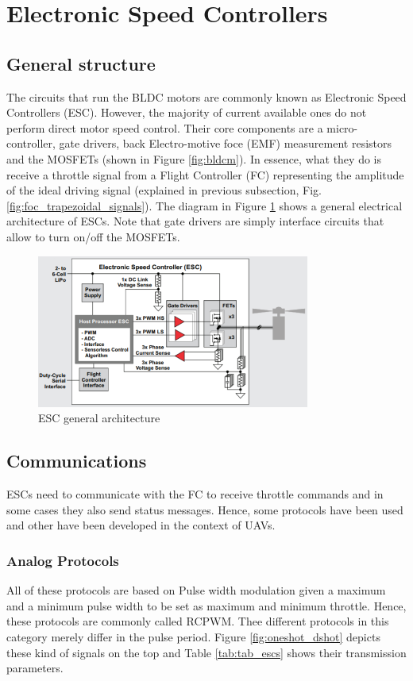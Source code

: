 \section{Electronic Speed Controllers}
\subsection{General structure}
The circuits that run the BLDC motors are commonly known as Electronic Speed Controllers (ESC). However, the majority of current available ones do not perform direct motor speed control. Their core components are a micro-controller, gate drivers, back Electro-motive foce (EMF) measurement resistors and the MOSFETs (shown in Figure \ref{fig:bldcm}). In essence, what they do is receive a throttle signal from a Flight Controller (FC) representing the amplitude of the ideal driving signal (explained in previous subsection, Fig. \ref{fig:foc_trapezoidal_signals}). The diagram in Figure \ref{fig:esc_diag} shows a general electrical architecture of ESCs. Note that gate drivers are simply interface circuits that allow to turn on/off the MOSFETs.
\begin{figure}
    \centering
    \includegraphics[width=0.8\textwidth]{images/esc_diagram.PNG}
    \caption{ESC general architecture \cite{Mogensen_ESC_Motor_Control2016}}
    \label{fig:esc_diag}
\end{figure}

\subsection{Communications}
ESCs need to communicate with the FC to receive throttle commands and in some cases they also send status messages. Hence, some protocols have been used and other have been developed in the context of UAVs.

\subsubsection{Analog Protocols}
All of these protocols are based on Pulse width modulation given a maximum and a minimum pulse width to be set as maximum and minimum throttle. Hence, these protocols are commonly called RCPWM. Thee different protocols in this category merely differ in the pulse period. Figure \ref{fig:oneshot_dshot} depicts these kind of signals on the top and Table \ref{tab:tab_escs}  shows their transmission parameters.

